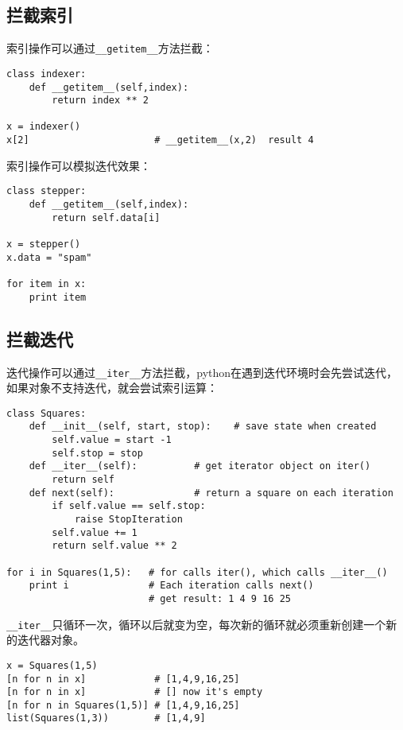 \subsection{拦截索引}

索引操作可以通过\verb|__getitem__|方法拦截：

\begin{lstlisting}
class indexer:
	def __getitem__(self,index):
		return index ** 2

x = indexer()
x[2]                      # __getitem__(x,2)  result 4
\end{lstlisting}

索引操作可以模拟迭代效果：

\begin{lstlisting}
class stepper:
	def __getitem__(self,index):
		return self.data[i]

x = stepper()
x.data = "spam"

for item in x:
	print item
\end{lstlisting}

\subsection{拦截迭代}

迭代操作可以通过\verb|__iter__|方法拦截，python在遇到迭代环境时会先尝试迭代，如果对象不支持迭代，就会尝试索引运算：

\begin{lstlisting}
class Squares:
	def __init__(self, start, stop):    # save state when created
		self.value = start -1
		self.stop = stop
	def __iter__(self):          # get iterator object on iter()
		return self
	def next(self):              # return a square on each iteration
		if self.value == self.stop:
			raise StopIteration
		self.value += 1
		return self.value ** 2

for i in Squares(1,5):   # for calls iter(), which calls __iter__()
	print i              # Each iteration calls next()
	                     # get result: 1 4 9 16 25
\end{lstlisting}

\verb|__iter__|只循环一次，循环以后就变为空，每次新的循环就必须重新创建一个新的迭代器对象。

\begin{lstlisting}
x = Squares(1,5)
[n for n in x]            # [1,4,9,16,25]
[n for n in x]            # [] now it's empty
[n for n in Squares(1,5)] # [1,4,9,16,25]
list(Squares(1,3))        # [1,4,9]
\end{lstlisting}

